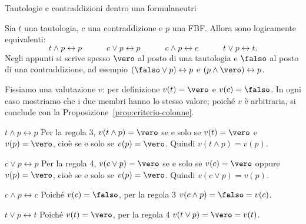 \begin{concetto}
\begin{Proposizione}{Tautologie e contraddizioni dentro una formula}{neutri}
    \begin{prerequisiti}
    \end{prerequisiti}
    Sia $t$ una tautologia, $c$ una contraddizione e $p$ una FBF. Allora sono logicamente equivalenti:
    \[ t \wedge p \leftrightarrow p \qquad\quad c \vee p \leftrightarrow p \qquad\quad c \wedge p \leftrightarrow c \qquad\quad t \vee p \leftrightarrow t. \]
    Negli appunti si scrive spesso $\vero$ al posto di una tautologia e $\falso$ al posto di una contraddizione,
    ad esempio $(\falso \vee p) \leftrightarrow p$ e $(p \wedge \vero) \leftrightarrow p$.
\end{Proposizione}
\begin{dimostrazione}
    Fissiamo una valutazione $v$: per definizione $v(t) = \vero$ e $v(c) = \falso$. In ogni caso mostriamo che i due
    membri hanno lo stesso valore; poiché $v$ è arbitraria, si conclude con la Proposizione~\ref{prop:criterio-colonne}.
    \begin{caso}{$t \wedge p \leftrightarrow p$}
        Per la regola 3, $v(t \wedge p) = \vero$ se e solo se $v(t) = \vero$ e $v(p) = \vero$, cioè se e solo se $v(p) = \vero$.
        Quindi $v(t \wedge p) = v(p)$.
    \end{caso}
    \begin{caso}{$c \vee p \leftrightarrow p$}
        Per la regola 4, $v(c \vee p) = \vero$ se e solo se $v(c) = \vero$ oppure $v(p) = \vero$, cioè se e solo se $v(p) = \vero$.
        Quindi $v(c \vee p) = v(p)$.
    \end{caso}
    \begin{caso}{$c \wedge p \leftrightarrow c$}
        Poiché $v(c) = \falso$, per la regola 3 $v(c \wedge p) = \falso = v(c)$.
    \end{caso}
    \begin{caso}{$t \vee p \leftrightarrow t$}
        Poiché $v(t) = \vero$, per la regola 4 $v(t \vee p) = \vero = v(t)$.
    \end{caso}
\end{dimostrazione}
\end{concetto}

